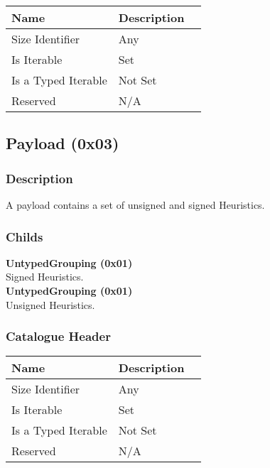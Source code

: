 \documentclass[11pt]{article}
\begin{document}
\begin{center}
\begin{tabular}{ |l|l|l| } 
\hline
\textbf{Name} & \textbf{Description}\\
\hline
Size Identifier & Any \\
Is Iterable & Set \\
Is a Typed Iterable & Not Set \\   
Reserved & N/A \\ 
\hline
\end{tabular}
\end{center}


\subsection{Payload (0x03)}
\subsubsection{Description}
A payload contains a set of unsigned and signed Heuristics.

\subsubsection{Childs}
\textbf{UntypedGrouping (0x01)} \\
Signed Heuristics. \\
\textbf{UntypedGrouping (0x01)} \\
Unsigned Heuristics. \\

\subsubsection{Catalogue Header}

\begin{center}
\begin{tabular}{ |l|l|l| } 
\hline
\textbf{Name} & \textbf{Description}\\
\hline
Size Identifier & Any \\
Is Iterable & Set \\
Is a Typed Iterable & Not Set \\   
Reserved & N/A \\ 
\hline
\end{tabular}
\end{center}

\end{document}
